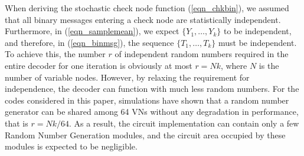\documentclass[12pt,journal,twoside,draftcls,onecolumn]{IEEEtran}
\begin{document}
	When deriving the stochastic check node function (\ref{eqn_chkbin}), we assumed that all binary messages entering a check node are statistically independent. Furthermore, in (\ref{eqn_samplemean}), we expect $\{Y_1, \ldots, Y_k\}$ to be independent, and therefore, in (\ref{eqn_binmsg}), the sequence $\{T_1, \ldots, T_k\}$ must be independent.
	To achieve this, the number $r$ of independent random numbers required in the entire decoder for one iteration is obviously at most $r = Nk$, where $N$ is the number of variable nodes.
	However, by relaxing the requirement for independence, the decoder can function with much less random numbers. For the codes considered in this paper, simulations have shown that a random number generator can be shared among 64 VNs without any degradation in performance, that is $r = Nk/64$. 
	As a result, the circuit implementation can contain only a few Random Number Generation modules, and the circuit area occupied by these modules is expected to be negligible.
	
\end{document}

